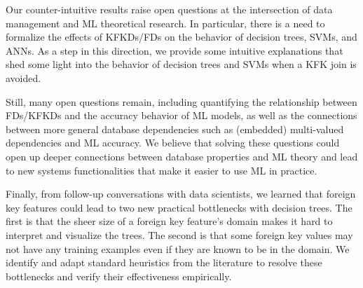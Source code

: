 \documentclass{vldb}
\newcommand{\eat}[1]{}
\begin{document}
Our counter-intuitive results raise open questions at the intersection of data management and ML theoretical research.
In particular, there is a need to formalize the effects of KFKDs/FDs on the behavior of decision trees, SVMs, and ANNs. 
As a step in this direction, we provide some intuitive explanations that shed some light into the behavior of decision trees and SVMs when a KFK join is avoided.
\eat{
Essentially, we explain why RBF-SVMs with foreign key features behave somewhat like a 1-nearest neighbor classifier due to 
the high dimensionality of foreign key features with one-hot encoding. 
While this leads to a form of \textit{memorization} of the foreign key's domain, this seems to have little effect on the 
model's generalization or test errors. This is similar to how memorization seems to occur in deep neural networks~\cite{rechtdnn}, 
but a key difference in our setting is that such memorization does not apply to \textit{all} features. 
We also discuss why decision trees are robust to operating with foreign key features. 
}
Still, many open questions remain, including quantifying the relationship between FDs/KFKDs and the accuracy behavior of ML models, 
as well as the connections between more general database dependencies such as (embedded) multi-valued dependencies and ML accuracy.
We believe that solving these questions could open up deeper connections between database properties and ML theory and lead to 
new systems functionalities that make it easier to use ML in practice.

\eat{
We extend the worst-case simulation scenario for linear models by replicating the foreign feature that determines the target multiple times. The idea is to make a model that uses 
the foreign key feature alone to overfit more than one that uses the foreign features. In particular, for the RBF-SVM, this scenario demonstrates that it behaves 
more similarly to a 1-nearest neighbor classifier when using the foreign key feature but less so when the number of relevant foreign features are increased.
}

Finally, from follow-up conversations with data scientists, we learned that foreign key features could lead to two new practical bottlenecks with 
decision trees. The first is that the sheer size of a foreign key feature's domain makes it hard to interpret and visualize the trees. 
The second is that some foreign key values may not have any training examples even if they are known to be in the domain. 
We identify and adapt standard heuristics from the literature to resolve these bottlenecks and verify their effectiveness empirically.
\eat{ 
For the first bottleneck, we propose simple lossy 
\textit{domain compression} methods that are configurable with a user-given size budget. For the second bottleneck, we propose a form of foreign key \textit{smoothing} 
that exploits foreign features as side information. We validate the accuracy of these techniques using both real and synthetic datasets.
}
\end{document}
